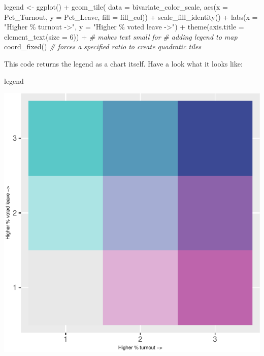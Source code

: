 \documentclass[
]{book}
\makeatletter
\newenvironment{Shaded}{\begin{snugshade}}{\end{snugshade}}
\newcommand{\AttributeTok}[1]{\textcolor[rgb]{0.61,0.61,0.61}{#1}}
\newcommand{\CommentTok}[1]{\textcolor[rgb]{0.37,0.37,0.37}{\textit{#1}}}
\newcommand{\DecValTok}[1]{\textcolor[rgb]{0.06,0.06,0.06}{#1}}
\newcommand{\FunctionTok}[1]{\textcolor[rgb]{0,0,0}{#1}}
\newcommand{\NormalTok}[1]{#1}
\newcommand{\OtherTok}[1]{\textcolor[rgb]{0.37,0.37,0.37}{#1}}
\newcommand{\SpecialCharTok}[1]{\textcolor[rgb]{0,0,0}{#1}}
\newcommand{\StringTok}[1]{\textcolor[rgb]{0.5,0.5,0.5}{#1}}
\newenvironment{kframe}{%
\medskip{}
\setlength{\fboxsep}{.8em}
 \def\at@end@of@kframe{}%
 \ifinner\ifhmode%
  \def\at@end@of@kframe{\end{minipage}}%
  \begin{minipage}{\columnwidth}%
 \fi\fi%
 \def\FrameCommand##1{\hskip\@totalleftmargin \hskip-\fboxsep
 \colorbox{shadecolor}{##1}\hskip-\fboxsep
     \hskip-\linewidth \hskip-\@totalleftmargin \hskip\columnwidth}%
 \MakeFramed {\advance\hsize-\width
   \@totalleftmargin\z@ \linewidth\hsize
   \@setminipage}}%
 {\par\unskip\endMakeFramed%
 \at@end@of@kframe}
\renewenvironment{Shaded}{\begin{kframe}}{\end{kframe}}
\makeatother
\begin{document}
\begin{Shaded}
\begin{Highlighting}[]
\NormalTok{legend }\OtherTok{\textless{}{-}} \FunctionTok{ggplot}\NormalTok{() }\SpecialCharTok{+}
  \FunctionTok{geom\_tile}\NormalTok{( }\AttributeTok{data =}\NormalTok{ bivariate\_color\_scale, }
             \FunctionTok{aes}\NormalTok{(}\AttributeTok{x =}\NormalTok{ Pct\_Turnout, }\AttributeTok{y =}\NormalTok{ Pct\_Leave, }\AttributeTok{fill =}\NormalTok{ fill\_col)) }\SpecialCharTok{+}
  \FunctionTok{scale\_fill\_identity}\NormalTok{() }\SpecialCharTok{+}
  \FunctionTok{labs}\NormalTok{(}\AttributeTok{x =} \StringTok{"Higher \% turnout {-}\textgreater{}"}\NormalTok{,}
       \AttributeTok{y =} \StringTok{"Higher \% voted leave {-}\textgreater{}"}\NormalTok{) }\SpecialCharTok{+}
  \FunctionTok{theme}\NormalTok{(}\AttributeTok{axis.title =} \FunctionTok{element\_text}\NormalTok{(}\AttributeTok{size =} \DecValTok{6}\NormalTok{)) }\SpecialCharTok{+} \CommentTok{\# makes text small for }
                                               \CommentTok{\# adding legend to map}
  \FunctionTok{coord\_fixed}\NormalTok{()  }\CommentTok{\# forces a specified ratio to create quadratic tiles}
\end{Highlighting}
\end{Shaded}

This code returns the legend as a chart itself. Have a look what it looks like:

\begin{Shaded}
\begin{Highlighting}[]
\NormalTok{legend}
\end{Highlighting}
\end{Shaded}

\includegraphics{crime_mapping_files/figure-latex/unnamed-chunk-149-1.pdf}
\end{document}
